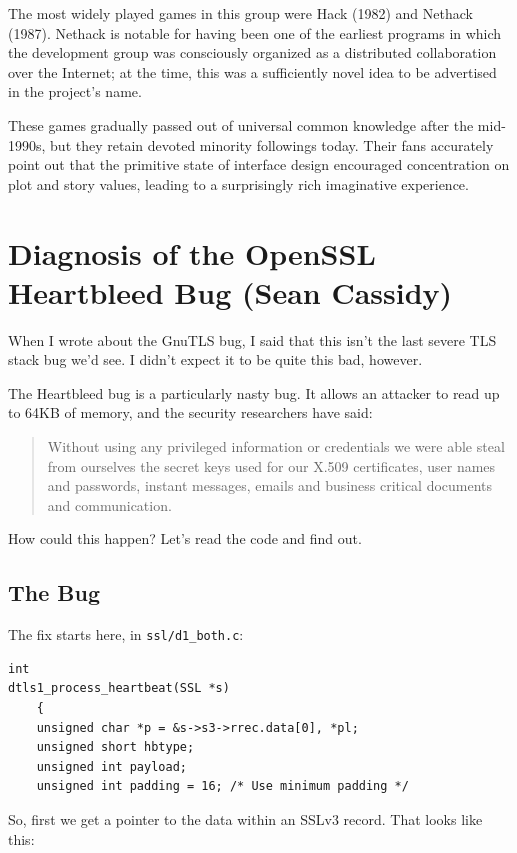 \documentclass[10pt,twoside,openleft]{memoir}
\begin{document}
The most widely played games in this group were Hack (1982) and Nethack (1987). Nethack is notable for having been one of the earliest programs in which the development group was consciously organized as a distributed collaboration over the Internet; at the time, this was a sufficiently novel idea to be advertised in the project's name.

These games gradually passed out of universal common knowledge after the mid-1990s, but they retain devoted minority followings today. Their fans accurately point out that the primitive state of interface design encouraged concentration on plot and story values, leading to a surprisingly rich imaginative experience.

\chapter{Diagnosis of the OpenSSL Heartbleed Bug (Sean Cassidy)}

When I wrote about the GnuTLS bug, I said that this isn't the last severe TLS stack bug we'd see. I didn't expect it to be quite this bad, however.

The Heartbleed bug is a particularly nasty bug. It allows an attacker to read up to 64KB of memory, and the security researchers have said:

\begin{quote}
 Without using any privileged information or credentials we were able steal from ourselves the secret keys used for our X.509 certificates, user names and passwords, instant messages, emails and business critical documents and communication.
\end{quote}

How could this happen? Let's read the code and find out.

\section{The Bug}

The fix starts here, in \texttt{ssl/d1\_both.c}:

{\footnotesize
\begin{verbatim}
int
dtls1_process_heartbeat(SSL *s)
    {
    unsigned char *p = &s->s3->rrec.data[0], *pl;
    unsigned short hbtype;
    unsigned int payload;
    unsigned int padding = 16; /* Use minimum padding */
\end{verbatim}
}

\noindent So, first we get a pointer to the data within an SSLv3 record. That looks like this:
\end{document}
